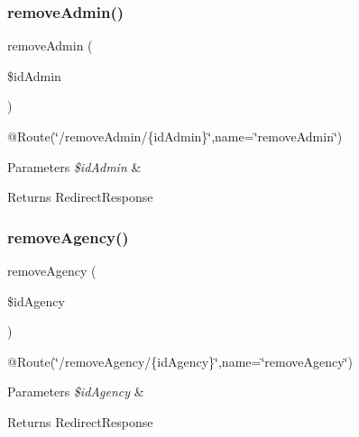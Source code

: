 \subsubsection{\texorpdfstring{removeAdmin()}{removeAdmin()}}
{\footnotesize\ttfamily remove\+Admin (\begin{DoxyParamCaption}\item[{}]{\$id\+Admin }\end{DoxyParamCaption})}

@\+Route(\char`\"{}/remove\+Admin/\{id\+Admin\}\char`\"{},name=\char`\"{}remove\+Admin\char`\"{}) 
\begin{DoxyParams}{Parameters}
{\em \$id\+Admin} & \\
\hline
\end{DoxyParams}
\begin{DoxyReturn}{Returns}
Redirect\+Response 
\end{DoxyReturn}
\mbox{\label{class_app_1_1_controller_1_1_back_office_controller_aaed7f556480a380f61b2a61cac7c83e9}} 
\subsubsection{\texorpdfstring{removeAgency()}{removeAgency()}}
{\footnotesize\ttfamily remove\+Agency (\begin{DoxyParamCaption}\item[{}]{\$id\+Agency }\end{DoxyParamCaption})}

@\+Route(\char`\"{}/remove\+Agency/\{id\+Agency\}\char`\"{},name=\char`\"{}remove\+Agency\char`\"{}) 
\begin{DoxyParams}{Parameters}
{\em \$id\+Agency} & \\
\hline
\end{DoxyParams}
\begin{DoxyReturn}{Returns}
Redirect\+Response 
\end{DoxyReturn}
\mbox{\label{class_app_1_1_controller_1_1_back_office_controller_aab3676ef04d81d0f17434f67e61ece2f}} 
